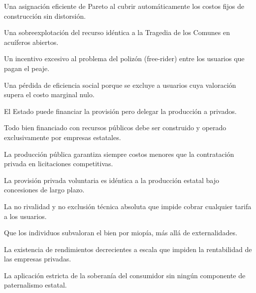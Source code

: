 \begin{opts}
    \item Una asignación eficiente de Pareto al cubrir automáticamente los costos fijos de construcción sin distorsión.
    \item Una sobreexplotación del recurso idéntica a la Tragedia de los Comunes en acuíferos abiertos.
    \item Un incentivo excesivo al problema del polizón (free-rider) entre los usuarios que pagan el peaje.
    \item Una pérdida de eficiencia social porque se excluye a usuarios cuya valoración supera el costo marginal nulo.
\end{opts}

\begin{opts}
    \item El Estado puede financiar la provisión pero delegar la producción a privados.
    \item Todo bien financiado con recursos públicos debe ser construido y operado exclusivamente por empresas estatales.
    \item La producción pública garantiza siempre costos menores que la contratación privada en licitaciones competitivas.
    \item La provisión privada voluntaria es idéntica a la producción estatal bajo concesiones de largo plazo.
\end{opts}

\begin{opts}
    \item La no rivalidad y no exclusión técnica absoluta que impide cobrar cualquier tarifa a los usuarios.
    \item Que los individuos subvaloran el bien por miopía, más allá de externalidades.
    \item La existencia de rendimientos decrecientes a escala que impiden la rentabilidad de las empresas privadas.
    \item La aplicación estricta de la soberanía del consumidor sin ningún componente de paternalismo estatal.
\end{opts}

